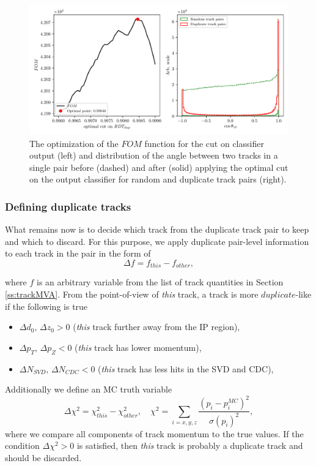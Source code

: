 \begin{figure}[H]
	\centering
	\captionsetup{width=0.8\linewidth}
	\includegraphics[width=\linewidth]{fig/ROECleanup_dup_opt}
	\caption{The optimization of the $FOM$ function for the cut on classifier output (left) and distribution of the angle between two tracks in a single pair before (dashed) and after (solid) applying the optimal cut on the output classifier for random and duplicate track pairs (right).}
	\label{fig:ROE_dupOpt}
\end{figure}

\subsubsection{Defining duplicate tracks}

What remains now is to decide which track from the duplicate track pair to keep and which to discard. For this purpose, we apply duplicate pair-level information to each track in the pair in the form of
\begin{equation}
\Delta f = f_{this} - f_{other},
\end{equation}

where $f$ is an arbitrary variable from the list of track quantities in Section \ref{ss:trackMVA}. From the point-of-view of \textit{this} track, a track is more $duplicate$-like if the following is true
\begin{itemize}
	\item $\Delta d_0,\,\Delta z_0 > 0$ (\textit{this} track further away from the IP region),
	\item $\Delta p_T,\,\Delta p_Z < 0$ (\textit{this} track has lower momentum),
	\item $\Delta N_{SVD},\,\Delta N_{CDC} < 0$ (\textit{this} track has less hits in the SVD and CDC),
\end{itemize}

Additionally we define an MC truth variable 
\begin{equation}
\label{eq:chi2}
\Delta \chi^2 = \chi^2_{this} - \chi^2_{other},\quad\chi^2 = \sum_{i=x,y,z}\frac{\left(p_i - p_i^{MC}\right)^2}{\sigma(p_i)^2},
\end{equation}
where we compare all components of track momentum to the true values. If the condition $\Delta \chi^2 > 0$ is satisfied, then \textit{this} track is probably a duplicate track and should be discarded.

